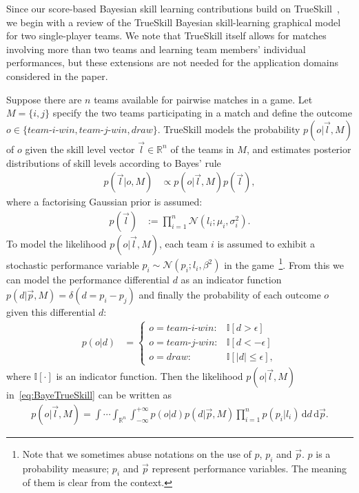 Since our score-based Bayesian skill learning contributions build on
TrueSkill~\cite{herbrich06569}, we begin with a review of the
TrueSkill Bayesian skill-learning graphical model for two
single-player teams.  We note that TrueSkill itself allows for matches
involving more than two teams and learning team members' individual
performances, but these extensions are not needed for the application
domains considered in the paper.

Suppose there are $n$ teams available for pairwise matches in a
game.  Let $M=\{i,j\}$ specify the two teams participating in a match
and define the outcome $o \in \{ \textit{team-i-win},
\textit{team-j-win}, \textit{draw} \}$.  TrueSkill models the
probability $p(o|\vec{l},M)$ of $o$ given the skill
level vector $\vec{l} \in \mathbb{R}^n$
of the teams in $M$,
and estimates
posterior distributions of skill levels according to Bayes' rule
\begin{align}
    p(\vec{l}|o,M) & \propto p(o|\vec{l},M) p(\vec{l}),
\label{eq:BayeTrueSkill}
\end{align}
where a factorising Gaussian prior is assumed:
\begin{align}
    p(\vec{l}) & :=\prod_{i=1}^{n}\mathcal{N}(l_i;\mu_i,\sigma_i^2).
\end{align}
To model the likelihood $p(o|\vec{l},M)$,
each team $i$ is assumed to exhibit a stochastic performance variable $p_i \sim
\mathcal{N}(p_i;l_i,\beta^2)$ in the game~\footnote{\noindent Note that we sometimes abuse notations on the use of $p$, $p_i$ and $\vec{p}$. $p$ is a probability measure; $p_i$ and $\vec{p}$ represent performance variables. The meaning of them is clear from the context.}. From this we can model
the performance differential $d$ as an indicator function $p(d|\vec{p},M) = \delta(d = p_i - p_j)$
and finally the probability of each outcome $o$ given this
differential $d$:
\begin{align}
p(o|d) & =
\begin{cases}
o = \textit{team-i-win}: & \mathbb{I}[d > \epsilon]\\
o = \textit{team-j-win}: & \mathbb{I}[d < -\epsilon]\\
o = \textit{draw}:       & \mathbb{I}[|d| \leq \epsilon],
\end{cases}
\end{align}
where $\mathbb{I}[\cdot]$ is an indicator function. Then the likelihood $p(o|\vec{l},M)$ in~\eqref{eq:BayeTrueSkill}
can be written as
\begin{align*} %
p(o|\vec{l},M) = \int \cdots \int_{\mathbb{R}^n} \int_{-\infty}^{+\infty} p(o|d) p(d|\vec{p},M) \prod_{i=1}^n p(p_i|l_i) \, \mathrm{d}d \, \mathrm{d}\vec{p}.
\end{align*}
